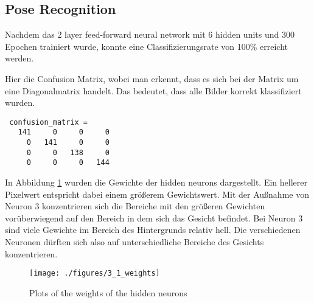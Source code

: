\subsection{Pose Recognition}
Nachdem das 2 layer feed-forward neural network mit 6 hidden units und 300 Epochen trainiert wurde, konnte
eine Classifizierungsrate von 100\% erreicht werden.

Hier die Confusion Matrix, wobei man erkennt, dass es sich bei der Matrix um eine Diagonalmatrix handelt. Das
bedeutet, dass alle Bilder korrekt klassifiziert wurden.
\begin{verbatim}
 confusion_matrix =
   141     0     0     0
     0   141     0     0
     0     0   138     0
     0     0     0   144
\end{verbatim}

In Abbildung \ref{fig:pose_weights} wurden die Gewichte der hidden neurons dargestellt. Ein hellerer Pixelwert
entspricht dabei einem größerem Gewichtswert.
Mit der Außnahme von Neuron 3 konzentrieren sich die Bereiche mit den größeren Gewichten vorüberwiegend
auf den Bereich in dem sich das Gesicht befindet. Bei Neuron 3 sind viele Gewichte im Bereich des Hintergrunds
relativ hell. Die verschiedenen Neuronen dürften sich also auf unterschiedliche Bereiche des Gesichts konzentrieren.
\begin{figure}[hp!]
\begin{center}
 \texttt{[image: ./figures/3\_1\_weights]}
 \caption{Plots of the weights of the hidden neurons}
\label{fig:pose_weights}
\end{center}
\end{figure}




